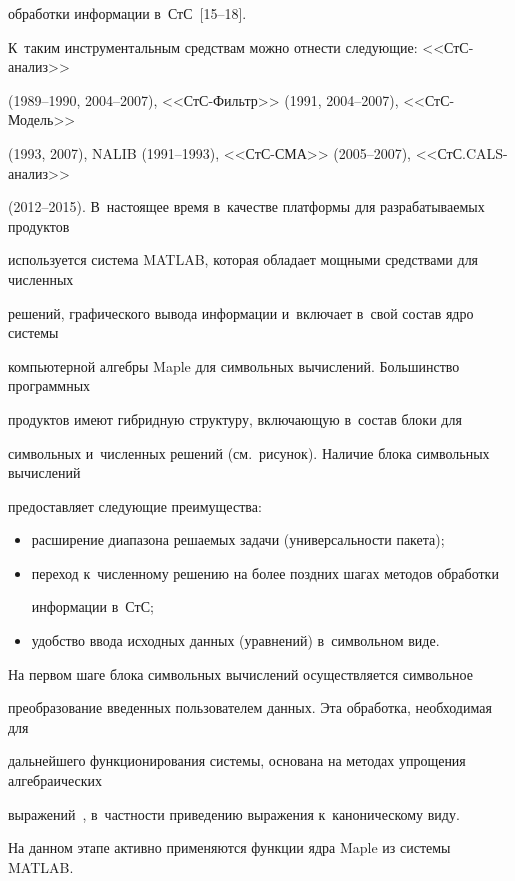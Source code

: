 обработки информации в~СтС~[15--18]. %

К~таким инструментальным средствам можно отнести следующие: <<СтС-анализ>> 

(1989--1990, 2004--2007), <<СтС-Фильтр>> (1991, 2004--2007), <<СтС-Модель>> 

(1993, 2007), NALIB (1991--1993), <<СтС-СМА>> (2005--2007), <<СтС.CALS-анализ>> 

(2012--2015). В~настоящее время в~качестве платформы для разрабатываемых продуктов 

используется система MATLAB, которая обладает мощными средствами для численных 

решений, графического вывода информации и~включает в~свой состав ядро системы 

компьютерной алгебры Maple для символьных вычислений. Большинство программных 

продуктов имеют гибридную структуру, включающую в~состав блоки для 

символьных и~численных решений (см.\ рисунок). Наличие блока символьных вычислений 

предоставляет следующие преимущества:

\begin{itemize}

\item     расширение диапазона решаемых задачи (универсальности пакета);



\item    переход к~численному решению на более поздних шагах методов обработки 

информации в~СтС;



\item     удобство ввода исходных данных (уравнений) в~символьном виде.

\end{itemize}



На первом шаге блока символьных вычислений осуществляется символьное 

преобразование введенных пользователем данных. Эта обработка, необходимая для 

дальнейшего функционирования системы, основана на методах упрощения алгебраических 

выражений~\cite{12-sin}, в~частности приведению выражения к~каноническому виду. 

На данном этапе активно применяются функции ядра Maple из системы MATLAB.









